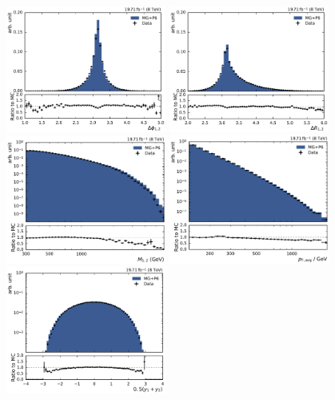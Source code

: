 \begin{figure}[htbp]
    \centering
    \includegraphics[width=0.47\textwidth]{figures/measurement/dijet_quantities_dijet_deltaphi.pdf}\hfill
    \includegraphics[width=0.47\textwidth]{figures/measurement/dijet_quantities_dijet_deltar.pdf}
    \includegraphics[width=0.47\textwidth]{figures/measurement/dijet_quantities_dijet_mass.pdf}\hfill
    \includegraphics[width=0.47\textwidth]{figures/measurement/dijet_quantities_ptavg.pdf}
    \includegraphics[width=0.47\textwidth]{figures/measurement/dijet_quantities_dijet_yboost.pdf}\hfill

\end{figure}
